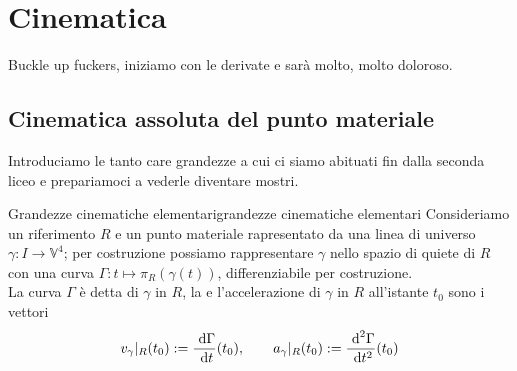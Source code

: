 \documentclass[annatarbolditalic, openany]{book}
\renewcommand\V{\mathbb{V}}
\begin{document}
\chapter{Cinematica}

Buckle up fuckers, iniziamo con le derivate e sarà molto, molto doloroso.

\section{Cinematica assoluta del punto materiale}

Introduciamo le tanto care grandezze a cui ci siamo abituati fin dalla seconda liceo e prepariamoci a vederle diventare mostri.

\begin{definition}{Grandezze cinematiche elementari}{grandezze cinematiche elementari}
    Consideriamo un riferimento $R$ e un punto materiale rapresentato da una linea di universo $\gamma : I \to \V^4$; per costruzione possiamo rappresentare $\gamma$ nello spazio di quiete di $R$ con una curva $\Gamma : t \mapsto \pi_R(\gamma(t))$, differenziabile per costruzione.\\
    La curva $\Gamma$ è detta  di $\gamma$ in $R$, la  e l'accelerazione di $\gamma$ in $R$ all'istante $t_0$ sono i vettori
    \[ v_\gamma|_R (t_0) := \frac{\text{ d} \Gamma}{\text{ d} t}(t_0), \qquad a_\gamma|_R(t_0) := \frac{\text{ d}^2 \Gamma}{\text{ d} t^2}(t_0) \]
\end{definition}


\printbibliography
\end{document}
